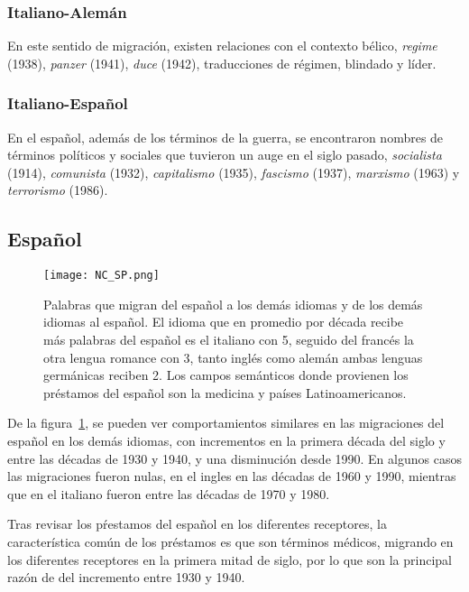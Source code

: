 \subsubsection*{Italiano-Alemán}%

En este sentido de migración,  existen relaciones con el contexto bélico,  \textit{regime} (1938), \textit{panzer} (1941), \textit{duce} (1942),  traducciones de régimen, blindado y líder.




\subsubsection*{Italiano-Español}%

En el español, además de los términos de la guerra, se encontraron nombres de términos políticos y sociales que tuvieron un auge en el siglo pasado,  \textit{socialista} (1914), \textit{comunista} (1932), \textit{capitalismo} (1935), \textit{fascismo} (1937),  \textit{marxismo} (1963) y \textit{terrorismo} (1986). 


\clearpage
\subsection{Español}%

\begin{figure}[h!] %
	\centering
	\texttt{[image: NC\_SP.png]}
	\caption{Palabras que migran del español a los demás idiomas y de los demás idiomas al español. El idioma que en promedio por década recibe más palabras del español es el italiano con 5, seguido del francés la otra lengua romance con 3, tanto inglés como alemán ambas lenguas germánicas reciben 2. Los campos semánticos donde provienen los préstamos del español son la medicina y países Latinoamericanos. }
	\label{fig.NC_SP}
\end{figure} %

De la figura~\ref{fig.NC_SP}, se pueden ver comportamientos similares en las migraciones del español en los demás idiomas, con incrementos en la primera década del siglo y entre las décadas de 1930 y 1940,  y una disminución desde 1990. En algunos casos las migraciones fueron nulas, en el ingles en las décadas de 1960 y 1990, mientras que en el italiano fueron entre las décadas de 1970  y 1980. 

Tras revisar los pŕestamos del español en los diferentes receptores,  la característica común de los préstamos es que son términos médicos, migrando en los diferentes receptores en la primera mitad de siglo, por lo que son la principal razón de del incremento entre 1930 y 1940. 



